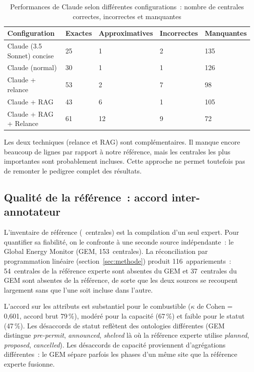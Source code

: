 \documentclass[a4paper,11pt]{report}
\begin{document}
\begin{longtable}[]{@{}lllll@{}}
\caption{Performances de Claude selon différentes configurations~: nombre de centrales correctes, incorrectes et manquantes}\label{tab:performances}\\
\toprule
Configuration & Exactes & Approximatives & Incorrectes & Manquantes \\
\midrule
\endhead
\bottomrule
\endlastfoot
Claude (3.5 Sonnet) concise & 25 & 1 & 2 & 135 \\
Claude (normal) & 30 & 1 & 1 & 126 \\
Claude + relance & 53 & 2 & 7 & 98 \\
Claude + RAG & 43 & 6 & 1 & 105 \\
Claude + RAG + Relance & 61 & 12 & 9 & 72 \\
\end{longtable}

Les deux techniques (relance et RAG) sont complémentaires. Il manque encore beaucoup de lignes par rapport à notre référence, mais les centrales les plus importantes sont probablement incluses. Cette approche ne permet toutefois pas de remonter le pedigree complet des résultats.

\subsection{Qualité de la référence~: accord inter-annotateur}\label{sec:reconciliation}

L'inventaire de référence (\NumRefPlants~centrales) est la compilation d'un seul expert. Pour quantifier sa fiabilité, on le confronte à une seconde source indépendante~: le Global Energy Monitor (GEM, 153~centrales). La réconciliation par programmation linéaire (section~\ref{sec:methode}) produit 116~appariements~: 54~centrales de la référence experte sont absentes du GEM et 37~centrales du GEM sont absentes de la référence, de sorte que les deux sources se recoupent largement sans que l'une soit incluse dans l'autre.

L'accord sur les attributs est substantiel pour le combustible ($\kappa$ de Cohen = 0,601, accord brut 79\,\%), modéré pour la capacité (67\,\%) et faible pour le statut (47\,\%). Les désaccords de statut reflètent des ontologies différentes (GEM distingue \emph{pre-permit}, \emph{announced}, \emph{shelved} là où la référence experte utilise \emph{planned}, \emph{proposed}, \emph{cancelled}). Les désaccords de capacité proviennent d'agrégations différentes~: le GEM sépare parfois les phases d'un même site que la référence experte fusionne.
\end{document}
